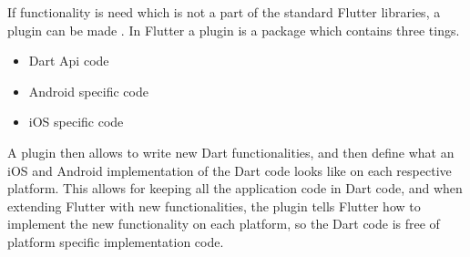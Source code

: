 If functionality is need which is not a part of the standard Flutter libraries, a plugin can be made \cite{docker_plugins}. In Flutter a plugin is a package which contains three tings.

\begin{itemize}
    \item  Dart Api code
    \item  Android specific code
    \item  iOS specific code
\end{itemize}

A plugin then allows to write new Dart functionalities, and then define what an iOS and Android implementation of the Dart code looks like on each respective platform. This allows for keeping all the application code in Dart code, and when extending Flutter  with new functionalities, the plugin tells Flutter how to implement the new functionality on each platform, so the Dart code is free of platform specific implementation code.